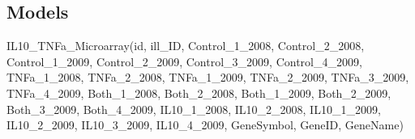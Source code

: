 \documentclass[letterpaper,10pt,english]{sphinxmanual}
\begin{document}
\subsection{Models}
\label{api:id1}\label{api:module-experimentdb.datasets.models}

\begin{fulllineitems}
\label{api:experimentdb.datasets.models.IL10_TNFa_Microarray}
IL10\_TNFa\_Microarray(id, ill\_ID, Control\_1\_2008, Control\_2\_2008, Control\_1\_2009, Control\_2\_2009, Control\_3\_2009, Control\_4\_2009, TNFa\_1\_2008, TNFa\_2\_2008, TNFa\_1\_2009, TNFa\_2\_2009, TNFa\_3\_2009, TNFa\_4\_2009, Both\_1\_2008, Both\_2\_2008, Both\_1\_2009, Both\_2\_2009, Both\_3\_2009, Both\_4\_2009, IL10\_1\_2008, IL10\_2\_2008, IL10\_1\_2009, IL10\_2\_2009, IL10\_3\_2009, IL10\_4\_2009, GeneSymbol, GeneID, GeneName)


\begin{fulllineitems}
\label{api:experimentdb.datasets.models.IL10_TNFa_Microarray.DoesNotExist}
\end{fulllineitems}


\begin{fulllineitems}
\label{api:experimentdb.datasets.models.IL10_TNFa_Microarray.MultipleObjectsReturned}
\end{fulllineitems}


\end{fulllineitems}

\end{document}
